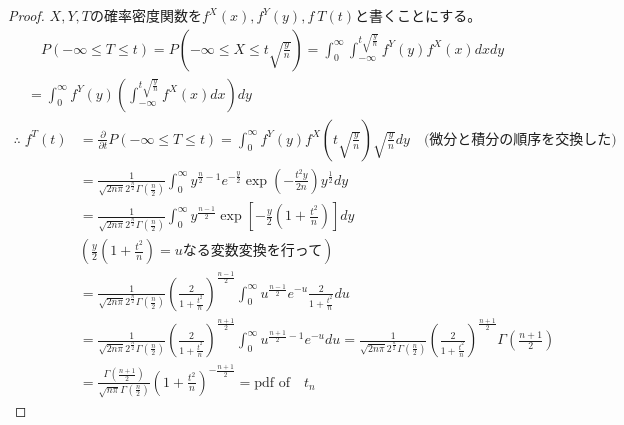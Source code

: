         \begin{proof}
            \quad\par
            $X,Y,T$の確率密度関数を$f^X(x),f^Y(y),f~T(t)$と書くことにする。
            \begin{align*}
                &\quad P(-\infty \leq T \leq t) = P\left(-\infty \leq X \leq t\sqrt{\frac{y}{n}}\right) = \int_{0}^{\infty}{\int_{-\infty}^{t\sqrt{\frac{y}{n}}}{f^Y(y)f^X(x) dx} dy} \\
                &= \int_{0}^{\infty}{f^Y(y)\left(\int_{-\infty}^{t\sqrt{\frac{y}{n}}}{f^X(x) dx}\right) dy}
            \end{align*}
            \begin{align*}
                \therefore \; f^T(t) &= \frac{\partial}{\partial t}P(-\infty \leq T \leq t) = \int_{0}^{\infty}{f^Y(y)f^X\left(t\sqrt{\frac{y}{n}}\right)\sqrt{\frac{y}{n}} dy}\quad\text{(微分と積分の順序を交換した)}\\
                &=\frac{1}{\sqrt{2n\pi}2^{\frac{n}{2}}\Gamma{\left(\frac{n}{2}\right)}}\int_{0}^{\infty}{y^{\frac{n}{2}-1}e^{-\frac{y}{2}}\exp{\left(-\frac{t^2y}{2n}\right)}y^{\frac{1}{2}} dy} \\
                &= \frac{1}{\sqrt{2n\pi}2^{\frac{n}{2}}\Gamma{\left(\frac{n}{2}\right)}}\int_{0}^{\infty}{y^{\frac{n-1}{2}}\exp{\left[-\frac{y}{2}\left(1+\frac{t^2}{n}\right)\right]} dy}\\
                &\left(\frac{y}{2}\left(1+\frac{t^2}{n}\right) = u \text{なる変数変換を行って}\right)\\
                &=\frac{1}{\sqrt{2n\pi}2^{\frac{n}{2}}\Gamma{\left(\frac{n}{2}\right)}}\left(\frac{2}{1+\frac{t^2}{n}}\right)^{\frac{n-1}{2}}\int_{0}^{\infty}{u^{\frac{n-1}{2}}e^{-u}\frac{2}{1+\frac{t^2}{n}} du}\\
                &=\frac{1}{\sqrt{2n\pi}2^{\frac{n}{2}}\Gamma{\left(\frac{n}{2}\right)}}\left(\frac{2}{1+\frac{t^2}{n}}\right)^{\frac{n+1}{2}}\int_{0}^{\infty}{u^{\frac{n+1}{2}-1}e^{-u} du} = \frac{1}{\sqrt{2n\pi}2^{\frac{n}{2}}\Gamma{\left(\frac{n}{2}\right)}}\left(\frac{2}{1+\frac{t^2}{n}}\right)^{\frac{n+1}{2}}\Gamma{\left(\frac{n+1}{2}\right)}\\
                &= \frac{\Gamma{\left(\frac{n+1}{2}\right)}}{\sqrt{n\pi}\Gamma{\left(\frac{n}{2}\right)}}\left(1+\frac{t^2}{n}\right)^{-\frac{n+1}{2}} = \text{pdf of} \quad t_n
            \end{align*}
        \end{proof}
